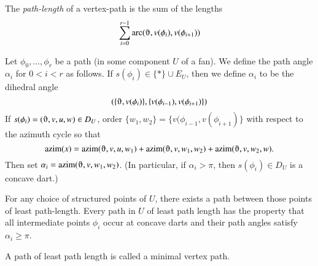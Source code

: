 The {\it path-length} of a vertex-path is the sum of the lengths
$$
\sum_{i=0}^{r-1}\arc(\orgn,v(\phi_i),v(\phi_{i+1}))
$$



\begin{definition}  Let $\phi_0,\ldots,\phi_r$ be a path (in
some component $U$ of a fan).  We define the path angle $\alpha_i$
for $0 < i < r$ as follows.  If $s(\phi_i)\in \{*\}\cup E_U$, then
we define $\alpha_i$ to be the dihedral angle 
   $$(\{\orgn,v(\phi_i)\},\{v(\phi_{i-1}),v(\phi_{i+1})\})$$
If $s(\phi_i)=(\orgn,v,u,w)\in D_U$, order $\{w_1,w_2\} = \{v(\phi_{i-1},v(\phi_{i+1})\}$ with respect to the azimuth cycle so that
  $$\op{azim}(x) = \op{azim}(\orgn,v,u,w_1)+\op{azim}(\orgn,v,w_1,w_2)+
    \op{azim}(\orgn,v,w_2,w).$$
Then set $\alpha_i = \op{azim}(\orgn,v,w_1,w_2)$.  (In particular,
if $\alpha_i >\pi$, then $s(\phi_i)\in D_U$ is a concave dart.)
\end{definition}

\begin{lemma}\label{lemma:min-path}
For any choice of structured points of $U$, there exists a path
between those points of least path-length.
Every path in $U$ of least path length has the property that
all intermediate points $\phi_i$ occur at concave darts and their path
angles satisfy $\alpha_i\ge\pi$.
\end{lemma}

\begin{definition} A path of least path length is called a minimal
vertex path.
\end{definition}

